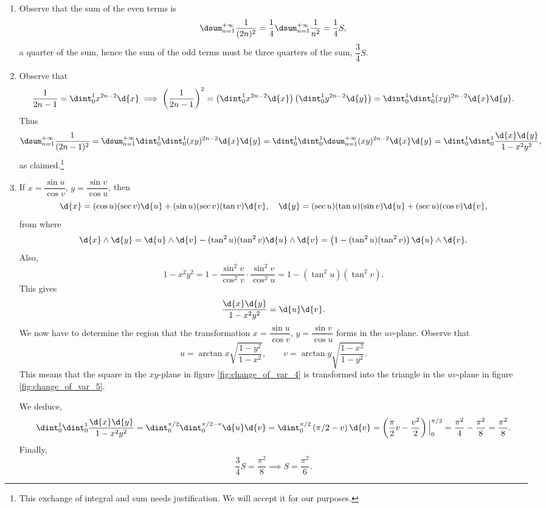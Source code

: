 \begin{solu}
\noindent
\begin{enumerate}
\item Observe that the sum of the even terms is
$$ \dsum _{n=1} ^{+\infty}\dfrac{1}{(2n)^2} = \dfrac{1}{4}\dsum _{n=1} 
^{+\infty}\dfrac{1}{n^2} = \dfrac{1}{4}S,
$$a quarter of the sum, hence the sum of the odd terms must be three quarters of 
the sum,
$\dfrac{3}{4}S$.
\item Observe that
$$ \dfrac{1}{2n-1} = \dint _0 ^1 x^{2n-2}\d{x} \implies 
\left(\dfrac{1}{2n-1}\right)^2 = \left(\dint _0 ^1 
x^{2n-2}\d{x}\right)\left(\dint _0 ^1 y^{2n-2}\d{y}\right)= \dint _0 ^1 \dint _0 
^1 (xy)^{2n-2}\d{x}\d{y}. $$
Thus
$$\dsum _{n=1} ^{+\infty}\dfrac{1}{(2n-1)^2} =  \dsum _{n=1} ^{+\infty} \dint _0 
^1 \dint _0 ^1 (xy)^{2n-2}\d{x}\d{y} = \dint _0 ^1 \dint _0 ^1  \dsum _{n=1} 
^{+\infty}(xy)^{2n-2}\d{x}\d{y}
=\dint _0 ^1 \dint _0 ^1 \dfrac{\d{x}\d{y}}{1-x^2y^2},$$ as
claimed.\footnote{This exchange of integral and sum needs
justification. We will accept it for our purposes.}


\item If $x=\dfrac{\sin u}{\cos v}$, $y=\dfrac{\sin
v}{\cos u}$, then
$$\d{x} = (\cos u)(\sec v)\d{u} + (\sin u)(\sec v)(\tan v)\d{v}, \quad \d{y} = 
(\sec u)(\tan u)(\sin v)\d{u}  + (\sec u)(\cos v)\d{v}, $$
from where
$$ \d{x}\wedge\d{y}= \d{u}\wedge\d{v} - (\tan^2u)(\tan^2v)\d{u}\wedge\d{v} = 
\left(1-(\tan^2u)(\tan^2v)\right)\d{u}\wedge\d{v}. $$
Also,
$$ 1-x^2y^2 = 1-\dfrac{\sin ^2v}{\cos^2v}\cdot \dfrac{\sin^2v}{\cos^2u} 
=1-(\tan^2u)(\tan^2v). $$
This gives
$$ \dfrac{\d{x}\d{y}}{1-x^2y^2}=\d{u}\d{v}. $$
We now have to determine the region that the transformation
$x=\dfrac{\sin u}{\cos v}$, $y=\dfrac{\sin v}{\cos u}$ forms in the
$uv$-plane. Observe that
$$ u=\arctan x\sqrt{\dfrac{1-y^2}{1-x^2}}, \qquad v =\arctan y 
\sqrt{\dfrac{1-x^2}{1-y^2}}.  $$
This means that the square in the $xy$-plane in figure
\ref{fig:change_of_var_4} is transformed into the triangle in the
$uv$-plane in figure \ref{fig:change_of_var_5}.



We deduce,
 $$\dint _0 ^1 \dint _0 ^1
\dfrac{\d{x}\d{y}}{1-x^2y^2} = \dint _0 ^{\pi /2}\dint _0 ^{\pi/2
-v}\d{u}\d{v} =\dint _0 ^{\pi /2}\left(\pi/2 -v\right)\d{v} =
\left(\dfrac{\pi}{2}v -\dfrac{v^2}{2}\right)\Big| _0 ^{\pi/2} =
\dfrac{\pi ^2}{4} - \dfrac{\pi ^2}{8} =\dfrac{\pi ^2}{8}.
$$
Finally,
$$ \dfrac{3}{4}S=\dfrac{\pi ^2}{8} \implies S =\dfrac{\pi ^2}{6}.$$
\end{enumerate}
\end{solu}






